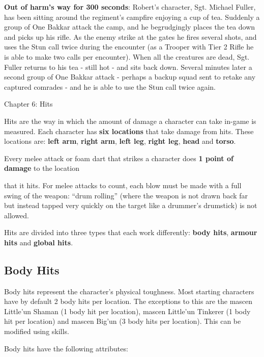 \documentclass{scrbook}
\begin{document}
\textbf{Out of harm's way for 300 seconds}: Robert's character, Sgt. Michael Fuller, has been sitting around the regiment's campfire enjoying a cup of tea. Suddenly a group of One Bakkar attack the camp, and he begrudgingly places the tea down and picks up his rifle. As the enemy strike at the gates he fires several shots, and uses the Stun call twice during the encounter (as a Trooper with Tier 2 Rifle he is able to make two calls per encounter). When all the creatures are dead, Sgt. Fuller returns to his tea - still hot - and sits back down. Several minutes later a second group of One Bakkar attack - perhaps a backup squad sent to retake any captured comrades - and he is able to use the Stun call twice again.

Chapter 6: Hits

Hits are the way in which the amount of damage a character can take in-game is measured. Each character has \textbf{six locations} that take damage from hits. These locations are: \textbf{left arm}, \textbf{right arm}, \textbf{left leg}, \textbf{right leg}, \textbf{head} and \textbf{torso}.

Every melee attack or foam dart that strikes a character does \textbf{1 point of damage} to the location

that it hits. For melee attacks to count, each blow must be made with a full swing of the weapon: ``drum rolling'' (where the weapon is not drawn back far but instead tapped very quickly on the target like a drummer's drumstick) is not allowed.

Hits are divided into three types that each work differently: \textbf{body hits}, \textbf{armour hits} and \textbf{global hits}.

\subsection{Body Hits}

Body hits represent the character's physical toughness. Most starting characters have by default 2 body hits per location. The exceptions to this are the mascen Little'un Shaman (1 body hit per location), mascen Little'un Tinkerer (1 body hit per location) and mascen Big'un (3 body hits per location). This can be modified using skills.

Body hits have the following attributes:
\end{document}
